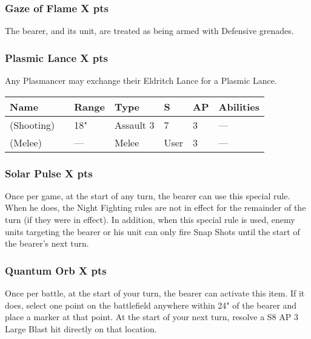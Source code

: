 \subsubsection[Gaze of Flame ]{Gaze of Flame  \hrulefill X pts}

The bearer, and its unit, are treated as being armed with Defensive grenades.

\subsubsection[Plasmic Lance ]{Plasmic Lance  \hrulefill X pts}

Any Plasmancer may exchange their Eldritch Lance for a Plasmic Lance.

\label{Plasmic Lance}
\noindent
\begin{tabular}{||m{130pt} m{10pt} m{31pt} m{55pt} m{12pt} m{12pt} m{210pt}||}
	\hline
	Name & & Range & Type & S & AP & Abilities \\
	\hline
	\quickref{Plasmic Lance} (Shooting) & & 18" & Assault 3 & 7 & 3 & — \\
	\quickref{Plasmic Lance} (Melee) & & — & Melee & User & 3 & — \\
	\hline
\end{tabular}

\subsubsection[Solar Pulse ]{Solar Pulse  \hrulefill X pts}

Once per game, at the start of any turn, the bearer can use this special rule. When he does, the Night Fighting rules are not in effect for the remainder of the turn (if they were in effect). In addition, when this special rule is used, enemy units targeting the bearer or his unit can only fire Snap Shots until the start of the bearer’s next turn.

\subsubsection[Quantum Orb ]{Quantum Orb  \hrulefill X pts}

Once per battle, at the start of your turn, the bearer can activate this item. If it does, select one point on the battlefield anywhere within 24" of the bearer and place a marker at that point. At the start of your next turn, resolve a S8 AP 3 Large Blast hit directly on that location.


